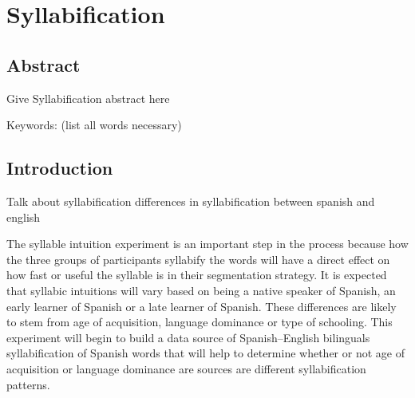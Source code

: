 
\chapter{Syllabification} %

\label{Chapter2} %


\section{Abstract}

Give Syllabification abstract here

Keywords: (list all words necessary)


\section{Introduction}

Talk about syllabification
differences in syllabification between spanish and english

The syllable intuition experiment is an important step in the process because how the three groups of participants syllabify the words will have a direct effect on how fast or useful the syllable is in their segmentation strategy. It is expected that syllabic intuitions will vary based on being a native speaker of Spanish, an early learner of Spanish or a late learner of Spanish. These differences are likely to stem from age of acquisition, language dominance or type of schooling. This experiment will begin to build a data source of Spanish–English bilinguals syllabification of Spanish words that will help to determine whether or not age of acquisition or language dominance are sources are different syllabification patterns. 



